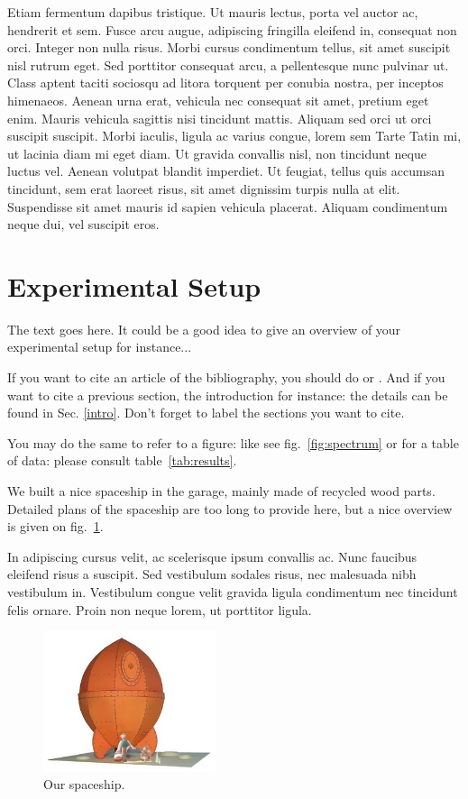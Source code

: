 \documentclass[final,12pt]{article}
\begin{document}
Etiam fermentum dapibus tristique. Ut mauris lectus, porta vel auctor
ac, hendrerit et sem. Fusce arcu augue, adipiscing fringilla eleifend
in, consequat non orci. Integer non nulla risus. Morbi cursus
condimentum tellus, sit amet suscipit nisl rutrum eget. Sed porttitor
consequat arcu, a pellentesque nunc pulvinar ut. Class aptent taciti
sociosqu ad litora torquent per conubia nostra, per inceptos
himenaeos. Aenean urna erat, vehicula nec consequat sit amet, pretium
eget enim. Mauris vehicula sagittis nisi tincidunt mattis. Aliquam sed
orci ut orci suscipit suscipit. Morbi iaculis, ligula ac varius
congue, lorem sem Tarte Tatin mi, ut lacinia diam mi eget diam. Ut
gravida convallis nisl, non tincidunt neque luctus vel. Aenean
volutpat blandit imperdiet. Ut feugiat, tellus quis accumsan
tincidunt, sem erat laoreet risus, sit amet dignissim turpis nulla at
elit. Suspendisse sit amet mauris id sapien vehicula placerat. Aliquam
condimentum neque dui, vel suscipit eros.

\section{Experimental Setup}

The text goes here. It could be a good idea to give an overview of your
experimental setup for instance...

If you want to cite an article of the bibliography, you should do
\cite{ipn-web} or \cite{Boh}. And if you want to cite a previous
section, the introduction for instance: the details can be found in
Sec. \ref{intro}. Don't forget to label the sections you want to
cite. 

You may do the same to refer to a figure: like see fig.~\ref{fig:spectrum}
or for a table of data: please consult table~\ref{tab:results}.

We built a nice spaceship in the garage, mainly made of recycled 
wood parts. Detailed plans of the spaceship are too long to provide
here, but a nice overview is given on fig.~\ref{fig:spaceship}.

In adipiscing cursus velit, ac scelerisque ipsum convallis ac. Nunc
faucibus eleifend risus a suscipit. Sed vestibulum sodales risus, nec
malesuada nibh vestibulum in. Vestibulum congue velit gravida ligula
condimentum nec tincidunt felis ornare. Proin non neque lorem, ut
porttitor ligula. 

\begin{figure}[h]
\begin{center}
\includegraphics[width=0.45\textwidth]{figures/wallace+and+gromit+rocket+papercraft.jpg}
\caption{Our spaceship.}\label{fig:spaceship}       %
\end{center}
\end{figure}
\end{document}
